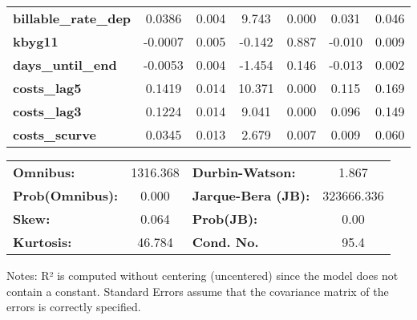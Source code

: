 \begin{center}
\begin{tabular}{lcccccc}
\textbf{billable\_rate\_dep}              &       0.0386  &        0.004     &     9.743  &         0.000        &        0.031    &        0.046     \\
\textbf{kbyg11}                           &      -0.0007  &        0.005     &    -0.142  &         0.887        &       -0.010    &        0.009     \\
\textbf{days\_until\_end}                 &      -0.0053  &        0.004     &    -1.454  &         0.146        &       -0.013    &        0.002     \\
\textbf{costs\_lag5}                      &       0.1419  &        0.014     &    10.371  &         0.000        &        0.115    &        0.169     \\
\textbf{costs\_lag3}                      &       0.1224  &        0.014     &     9.041  &         0.000        &        0.096    &        0.149     \\
\textbf{costs\_scurve}                    &       0.0345  &        0.013     &     2.679  &         0.007        &        0.009    &        0.060     \\
\bottomrule
\end{tabular}
\begin{tabular}{lclc}
\textbf{Omnibus:}       & 1316.368 & \textbf{  Durbin-Watson:     } &     1.867   \\
\textbf{Prob(Omnibus):} &   0.000  & \textbf{  Jarque-Bera (JB):  } & 323666.336  \\
\textbf{Skew:}          &   0.064  & \textbf{  Prob(JB):          } &      0.00   \\
\textbf{Kurtosis:}      &  46.784  & \textbf{  Cond. No.          } &      95.4   \\
\bottomrule
\end{tabular}
\end{center}

Notes: \newline
 [1] R² is computed without centering (uncentered) since the model does not contain a constant. \newline
 [2] Standard Errors assume that the covariance matrix of the errors is correctly specified.